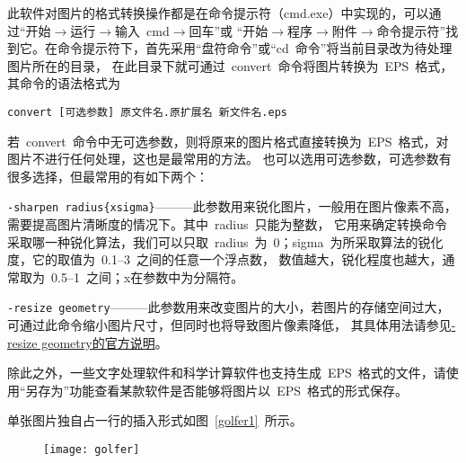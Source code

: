 此软件对图片的格式转换操作都是在命令提示符（cmd.exe）中实现的，可以通过“开始$\to$运行$\to$输入~cmd$\to$回车”或
“开始$\to$程序$\to$附件$\to$命令提示符”找到它。在命令提示符下，首先采用“盘符命令”或“cd~命令”将当前目录改为待处理图片所在的目录，
在此目录下就可通过~convert~命令将图片转换为~EPS~格式，其命令的语法格式为

\noindent\verb|convert [可选参数] 原文件名.原扩展名 新文件名.eps|

\noindent 若~convert~命令中无可选参数，则将原来的图片格式直接转换为~EPS~格式，对图片不进行任何处理，这也是最常用的方法。
也可以选用可选参数，可选参数有很多选择，但最常用的有如下两个：

\verb|-sharpen radius{xsigma}|———此参数用来锐化图片，一般用在图片像素不高，需要提高图片清晰度的情况下。其中~radius~只能为整数，
它用来确定转换命令采取哪一种锐化算法，我们可以只取~radius~为~0；sigma~为所采取算法的锐化度，它的取值为~0.1--3~之间的任意一个浮点数，
数值越大，锐化程度也越大，通常取为~0.5--1~之间；x在参数中为分隔符。

\verb|-resize geometry|———此参数用来改变图片的大小，若图片的存储空间过大，可通过此命令缩小图片尺寸，但同时也将导致图片像素降低，
其具体用法请参见\href{http://www.imagemagick.org/script/command-line-options.php#resize}{-resize geometry的官方说明}。

除此之外，一些文字处理软件和科学计算软件也支持生成~EPS~格式的文件，请使用“另存为”功能查看某款软件是否能够将图片以~EPS~格式的形式保存。

单张图片独自占一行的插入形式如图~\ref{golfer1}~所示。
\begin{figure}[htbp]
\centering
\texttt{[image: golfer]}
\vspace{-1em}
\end{figure}

